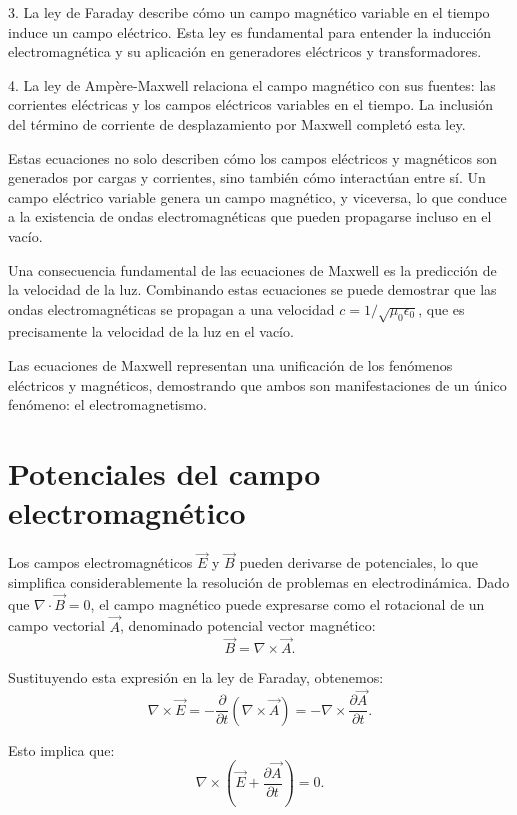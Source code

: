 \documentclass[12pt,a4paper]{book}
\begin{document}
3. La ley de Faraday describe cómo un campo magnético variable en el tiempo induce un campo eléctrico. Esta ley es fundamental para entender la inducción electromagnética y su aplicación en generadores eléctricos y transformadores.

4. La ley de Ampère-Maxwell relaciona el campo magnético con sus fuentes: las corrientes eléctricas y los campos eléctricos variables en el tiempo. La inclusión del término de corriente de desplazamiento por Maxwell completó esta ley.

Estas ecuaciones no solo describen cómo los campos eléctricos y magnéticos son generados por cargas y corrientes, sino también cómo interactúan entre sí. Un campo eléctrico variable genera un campo magnético, y viceversa, lo que conduce a la existencia de ondas electromagnéticas que pueden propagarse incluso en el vacío.

Una consecuencia fundamental de las ecuaciones de Maxwell es la predicción de la velocidad de la luz. Combinando estas ecuaciones se puede demostrar que las ondas electromagnéticas se propagan a una velocidad $c = 1/\sqrt{\mu_0\epsilon_0}$, que es precisamente la velocidad de la luz en el vacío.

Las ecuaciones de Maxwell representan una unificación de los fenómenos eléctricos y magnéticos, demostrando que ambos son manifestaciones de un único fenómeno: el electromagnetismo.

\section{Potenciales del campo electromagnético}

Los campos electromagnéticos $\vec{E}$ y $\vec{B}$ pueden derivarse de potenciales, lo que simplifica considerablemente la resolución de problemas en electrodinámica. Dado que $\nabla \cdot \vec{B} = 0$, el campo magnético puede expresarse como el rotacional de un campo vectorial $\vec{A}$, denominado potencial vector magnético:
\begin{equation}
\vec{B} = \nabla \times \vec{A}.
\end{equation}

Sustituyendo esta expresión en la ley de Faraday, obtenemos:
\begin{equation}
\nabla \times \vec{E} = -\frac{\partial}{\partial t}(\nabla \times \vec{A}) = -\nabla \times \frac{\partial \vec{A}}{\partial t}.
\end{equation}

Esto implica que:
\begin{equation}
\nabla \times \left(\vec{E} + \frac{\partial \vec{A}}{\partial t}\right) = 0.
\end{equation}
\end{document}
